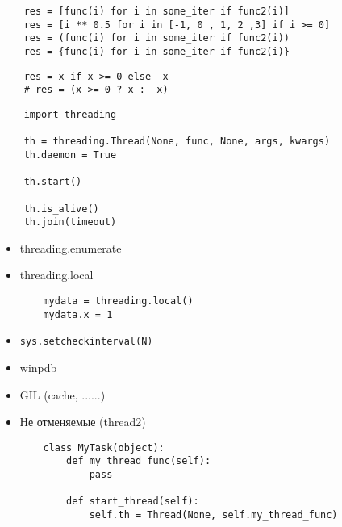 \documentclass{article}
\begin{document}
\LARGE


{
\LARGE \vspace{15pt}
\begin{lstlisting}
	res = [func(i) for i in some_iter if func2(i)]
	res = [i ** 0.5 for i in [-1, 0 , 1, 2 ,3] if i >= 0]
	res = (func(i) for i in some_iter if func2(i))
	res = {func(i) for i in some_iter if func2(i)}
\end{lstlisting}
}


{
\LARGE \vspace{15pt}
\begin{lstlisting}
	res = x if x >= 0 else -x
	# res = (x >= 0 ? x : -x)
\end{lstlisting}
}

\newpage
\newpage
{
\LARGE \vspace{15pt}
\begin{lstlisting}
	import threading

	th = threading.Thread(None, func, None, args, kwargs)
	th.daemon = True

	th.start()

	th.is_alive()
	th.join(timeout)
\end{lstlisting}
}
\newpage

\begin{itemize}
	\item threading.enumerate
	\item threading.local
{
\LARGE \vspace{15pt}
\begin{lstlisting}
	mydata = threading.local()
	mydata.x = 1	
\end{lstlisting}
}
	\item \lstinline!sys.setcheckinterval(N)!
\end{itemize}
\newpage

\begin{itemize}
	\item winpdb
	\item GIL (cache, ......)
	\item Не отменяемые (thread2)
{
\LARGE \vspace{15pt}
\begin{lstlisting}
	class MyTask(object):
		def my_thread_func(self):
			pass

		def start_thread(self):
			self.th = Thread(None, self.my_thread_func)
\end{lstlisting}
}
\end{itemize}
\newpage
\end{document}
